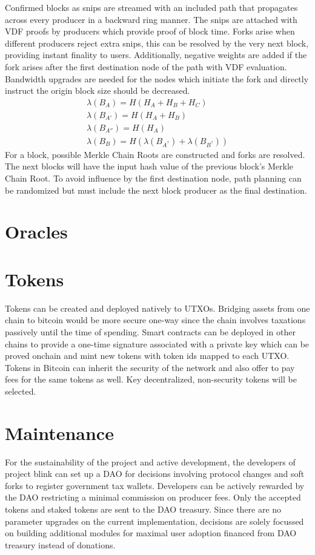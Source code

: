 \documentclass[a4paper,10pt]{article}
\begin{document}
Confirmed blocks as snips are streamed with an included path that propagates across every producer in a backward ring manner. The snips are attached with VDF proofs by producers which provide proof of block time. Forks arise when different producers reject extra snips, this can be resolved by the very next block, providing instant finality to users. Additionally, negative weights are added if the fork arises after the first destination node of the path with VDF evaluation. Bandwidth upgrades are needed for the nodes which initiate the fork and directly instruct the origin block size should be decreased.
\begin{align}
\lambda (B_A) = H(H_A+H_B+H_C) \\
\lambda (B_{A'}) = H(H_A+H_B)\\
\lambda (B_{A''}) = H(H_A)  \\
\lambda (B_{B}) = H(\lambda(B_{A^?}) + \lambda(B_{B^?}))
\end{align}
For a block, possible Merkle Chain Roots are constructed and forks are resolved. The next blocks will have the input hash value of the previous block's Merkle Chain Root. To avoid influence by the first destination node, path planning can be randomized but must include the next block producer as the final destination.
\section{Oracles}

\section{Tokens}
Tokens can be created and deployed natively to UTXOs. Bridging assets from one chain to bitcoin would be more secure one-way since the chain involves taxations passively until the time of spending. Smart contracts can be deployed in other chains to provide a one-time signature associated with a private key which can be proved onchain and mint new tokens with token ids mapped to each UTXO. Tokens in Bitcoin can inherit the security of the network and also offer to pay fees for the same tokens as well. Key decentralized, non-security tokens will be selected. 
 
\section{Maintenance}
For the sustainability of the project and active development, the developers of project blink can set up a DAO for decisions involving protocol changes and soft forks to register government tax wallets. Developers can be actively rewarded by the DAO restricting a minimal commission on producer fees. Only the accepted tokens and staked tokens are sent to the DAO treasury. Since there are no parameter upgrades on the current implementation, decisions are solely focussed on building additional modules for maximal user adoption financed from DAO treasury instead of donations.
\end{document}
